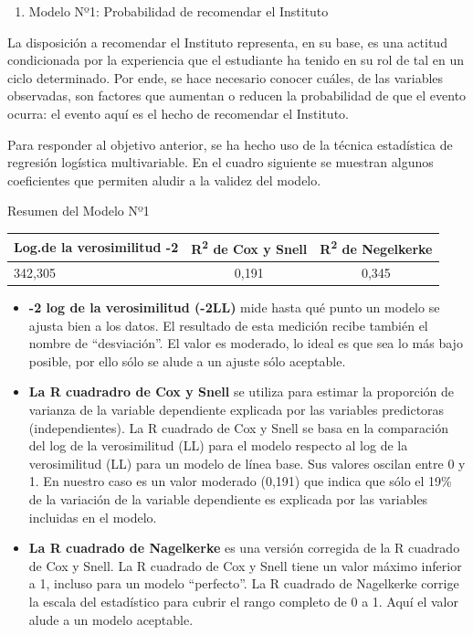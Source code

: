 \documentclass[]{book}
\providecommand{\tightlist}{%
  \setlength{\itemsep}{0pt}\setlength{\parskip}{0pt}}
\begin{document}
\begin{enumerate}
\def\labelenumi{\alph{enumi})}
\tightlist
\item
  Modelo Nº1: Probabilidad de recomendar el Instituto
\end{enumerate}

La disposición a recomendar el Instituto representa, en su base, es una
actitud condicionada por la experiencia que el estudiante ha tenido en
su rol de tal en un ciclo determinado. Por ende, se hace necesario
conocer cuáles, de las variables observadas, son factores que aumentan o
reducen la probabilidad de que el evento ocurra: el evento aquí es el
hecho de recomendar el Instituto.

Para responder al objetivo anterior, se ha hecho uso de la técnica
estadística de regresión logística multivariable. En el cuadro siguiente
se muestran algunos coeficientes que permiten aludir a la validez del
modelo.

Resumen del Modelo Nº1

\begin{longtable}[]{@{}lcc@{}}
\toprule
Log.de la verosimilitud -2 & R\textsuperscript{2} de Cox y Snell &
R\textsuperscript{2} de Negelkerke\tabularnewline
\midrule
\endhead
342,305 & 0,191 & 0,345\tabularnewline
\bottomrule
\end{longtable}

\begin{itemize}
\item
  \textbf{-2 log de la verosimilitud (-2LL)} mide hasta qué punto un
  modelo se ajusta bien a los datos. El resultado de esta medición
  recibe también el nombre de ``desviación''. El valor es moderado, lo
  ideal es que sea lo más bajo posible, por ello sólo se alude a un
  ajuste sólo aceptable.
\item
  \textbf{La R cuadradro de Cox y Snell} se utiliza para estimar la
  proporción de varianza de la variable dependiente explicada por las
  variables predictoras (independientes). La R cuadrado de Cox y Snell
  se basa en la comparación del log de la verosimilitud (LL) para el
  modelo respecto al log de la verosimilitud (LL) para un modelo de
  línea base. Sus valores oscilan entre 0 y 1. En nuestro caso es un
  valor moderado (0,191) que indica que sólo el 19\% de la variación de
  la variable dependiente es explicada por las variables incluidas en el
  modelo.
\item
  \textbf{La R cuadrado de Nagelkerke} es una versión corregida de la R
  cuadrado de Cox y Snell. La R cuadrado de Cox y Snell tiene un valor
  máximo inferior a 1, incluso para un modelo ``perfecto''. La R
  cuadrado de Nagelkerke corrige la escala del estadístico para cubrir
  el rango completo de 0 a 1. Aquí el valor alude a un modelo aceptable.
\end{itemize}
\end{document}
